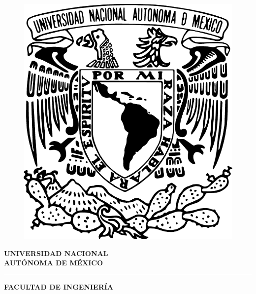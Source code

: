 \begin{titlepage}
\thispagestyle{empty}
\noindent
\begin{minipage}[c]{0.25\textwidth}%

\begin{figure}[H]
\includegraphics[width=0.7\linewidth]{Figuras/Escudo-UNAM.pdf}
\end{figure}
\end{minipage}\hfill\begin{minipage}[c]{0.75\textwidth}%
\begin{center}
\textbf{\Huge {UNIVERSIDAD NACIONAL\\[2mm]
AUTÓNOMA DE MÉXICO}}\vspace{5mm}
\hrule height 2.5pt \vspace{5mm}
\textbf{\Huge {FACULTAD DE INGENIERÍA}}
\end{center}
\end{minipage}

\noindent
\begin{minipage}[t]{0.25\textwidth}%
\vspace{5mm}
\hspace{0.9cm}
\vrule width2.5pt height13cm
\hspace{8mm}
\vrule width2.5pt height13cm
\end{minipage}\hfill\begin{minipage}[t]{0.75\textwidth}%


\end{minipage}
\end{titlepage}
